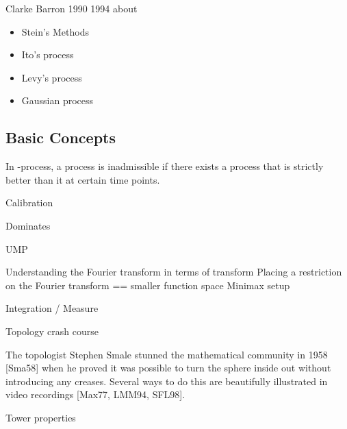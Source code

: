Clarke Barron 1990 1994 about
\begin{itemize}
    \item Stein's Methods
    \item Ito's process
    \item Levy's process
    \item Gaussian process
\end{itemize}

\subsection{Basic Concepts}

\begin{define}[Admissibility]
    In \E-process, a process is inadmissible 
    if there exists a process that is strictly better than it at certain time points.
\end{define}

Calibration

Dominates

UMP

Understanding the Fourier transform in terms of transform
	Placing a restriction on the Fourier transform == smaller function space
Minimax setup

Integration / Measure

Topology crash course

The topologist Stephen Smale stunned the mathematical community in
1958 [Sma58] when he proved it was possible to turn the sphere inside out
without introducing any creases. Several ways to do this are beautifully
illustrated in video recordings [Max77, LMM94, SFL98].

Tower properties




